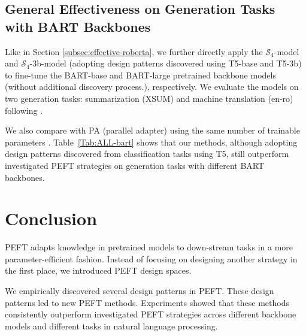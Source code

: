 \subsection{General Effectiveness on Generation Tasks with BART Backbones}

Like in Section \ref{subsec:effective-roberta},
we further directly apply the 
$\mathcal{S}_4$-model and $\mathcal{S}_4$-3b-model (adopting design patterns discovered using T5-base and T5-3b) to fine-tune the BART-base and BART-large pretrained backbone models (without additional discovery process.), respectively. We evaluate the models on two generation tasks: summarization (XSUM) and machine translation (en-ro) following \citet{https://doi.org/10.48550/arxiv.2110.04366}. 

We also compare with PA (parallel adapter) using the same number of trainable parameters \citep{https://doi.org/10.48550/arxiv.2110.04366}. 
Table~\ref{Tab:ALL-bart} shows that our methods, although adopting design patterns discovered from classification tasks using T5, still outperform investigated PEFT strategies on generation tasks with different BART backbones.

\section{Conclusion}

PEFT adapts knowledge in pretrained models to down-stream tasks in a more parameter-efficient fashion. Instead of focusing on designing another strategy in the first place, we introduced PEFT design spaces. 

We empirically discovered several design patterns in PEFT. These design patterns led to new PEFT methods. Experiments showed that these methods consistently outperform investigated PEFT strategies across different backbone models and different tasks in natural language processing.


